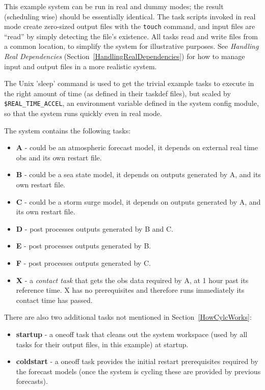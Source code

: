 

This example system can be run in real and dummy modes; the result
(scheduling wise) should be essentially identical. The task scripts
invoked in real mode create zero-sized output files with the
\lstinline=touch= command, and input files are ``read'' by simply
detecting the file's existence.  All tasks read and write files from a
common location, to simplify the system for illustrative purposes. See
{\em Handling Real Dependencies}
(Section~\ref{HandlingRealDependencies}) for how to manage input and
output files in a more realistic system. 

The Unix 'sleep' command is used to get the trivial example tasks to
execute in the right amount of time (as defined in their taskdef files),
but scaled by \lstinline=$REAL_TIME_ACCEL=, an environment variable
defined in the system config module, so that the system runs quickly 
even in real mode.

The system contains the following tasks:

\begin{itemize}
    \item {\bf A} - could be an atmospheric forecast model,
    it depends on external real time obs and its own restart file.
    \item {\bf B} - could be a sea state model, it depends on 
    outputs generated by A, and its own restart file.
    \item {\bf C} - could be a storm surge model, it depends on 
    outputs generated by A, and its own restart file.
    \item {\bf D} - post processes outputs generated by B and C.
    \item {\bf E} - post processes outputs generated by B.
    \item {\bf F} - post processes outputs generated by C.
    \item {\bf X} - a {\em contact task} that gets the obs data required
    by A, at 1 hour past its reference time. X has no prerequisites and
    therefore runs immediately its contact time has passed.
\end{itemize}

There are also two additional tasks not mentioned in Section~\ref{HowCylcWorks}:

\begin{itemize}
    \item {\bf startup} - a oneoff task that cleans out the system
    workspace (used by all tasks for their output files, in this
    example) at startup.
    \item {\bf coldstart} - a oneoff task provides the initial restart
    prerequisites required by the forecast models (once the system
    is cycling these are provided by previous forecasts). 
\end{itemize}

